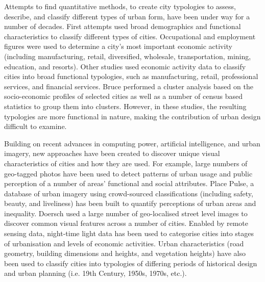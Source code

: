 \documentclass{nature}
\begin{document}
Attempts to find quantitative methods, to create city typologies to assess, describe, and classify different types of urban form, have been under way for a number of decades. First attempts used broad demographics and functional characteristics to classify different types of cities. Occupational and employment figures were used to determine a city's most important economic activity (including manufacturing, retail, diversified, wholesale, transportation, mining, education, and resorts)\cite{Harris1943}. Other studies used economic activity data to classify cities into broad functional typologies, such as manufacturing, retail, professional services, and financial services\cite{Nelson1955}. Bruce\cite{Bruce1971} performed a cluster analysis based on the socio-economic profiles of selected cities as well as a number of census based statistics to group them into clusters. However, in these studies, the resulting typologies are more functional in nature, making the contribution of urban design difficult to examine.

Building on recent advances in computing power, artificial intelligence, and urban imagery, new approaches have been created to discover unique visual characteristics of cities and how they are used. For example, large numbers of geo-tagged photos have been used to detect patterns of urban usage and public perception of a number of areas' functional and social attributes\cite{Liu2016,Zhou2014a}. Place Pulse, a database of urban imagery using crowd-sourced classifications (including safety, beauty, and liveliness) has been built to quantify perceptions of urban areas\cite{Dubey2016,Naik2014} and inequality\cite{Salesses2013}. Doersch\cite{Doersch2012} used a large number of geo-localised street level images to discover common visual features across a number of cities. Enabled by remote sensing data, night-time light data has been used to categorise cities into stages of urbanisation and levels of economic activities\cite{Zhang2013}. Urban characteristics (road geometry, building dimensions and heights, and vegetation heights) have also been used to classify cities into typologies of differing periods of historical design and urban planning (i.e. 19th Century, 1950s, 1970s, etc.)\cite{Hermosilla2014}.
\end{document}
